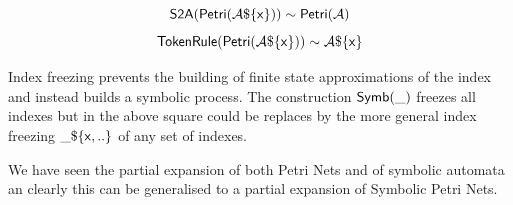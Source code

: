 \documentclass[]{article}
\begin{document}
\begin{center}
\begin{minipage}{0.4\textwidth}\end{minipage}
\begin{minipage}{0.4\textwidth}
\[{\sf S2A(Petri(\mathcal{A}\$\{x\}))\sim  Petri(\mathcal{A}) }\]
\[{\sf TokenRule(Petri(\mathcal{A}\$\{x\}))\sim  \mathcal{A}\$\{x\}}\]
\end{minipage}
\end{center}

Index freezing prevents the building of  finite state approximations of the index and instead builds a symbolic process. The construction ${\sf Symb(\_)}$ freezes all indexes but in the above square could be replaces by the more general index freezing ${\sf  \_\$\{x,..\}}$ of any set of indexes.

We have seen the partial expansion of both Petri Nets and of symbolic automata an clearly this can be generalised to a partial expansion of Symbolic Petri Nets.
\end{document}
